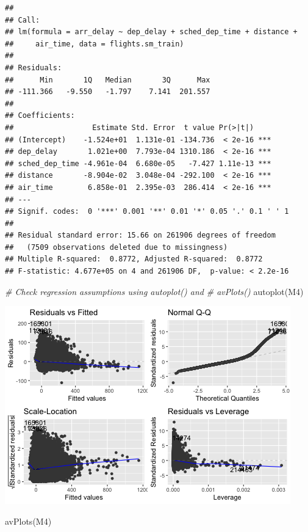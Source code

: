 \documentclass[
]{article}
\newenvironment{Shaded}{\begin{snugshade}}{\end{snugshade}}
\newcommand{\CommentTok}[1]{\textcolor[rgb]{0.56,0.35,0.01}{\textit{#1}}}
\newcommand{\FunctionTok}[1]{\textcolor[rgb]{0.00,0.00,0.00}{#1}}
\newcommand{\NormalTok}[1]{#1}
\begin{document}
\begin{verbatim}
## 
## Call:
## lm(formula = arr_delay ~ dep_delay + sched_dep_time + distance + 
##     air_time, data = flights.sm_train)
## 
## Residuals:
##      Min       1Q   Median       3Q      Max 
## -111.366   -9.550   -1.797    7.141  201.557 
## 
## Coefficients:
##                  Estimate Std. Error  t value Pr(>|t|)    
## (Intercept)    -1.524e+01  1.131e-01 -134.736  < 2e-16 ***
## dep_delay       1.021e+00  7.793e-04 1310.186  < 2e-16 ***
## sched_dep_time -4.961e-04  6.680e-05   -7.427 1.11e-13 ***
## distance       -8.904e-02  3.048e-04 -292.100  < 2e-16 ***
## air_time        6.858e-01  2.395e-03  286.414  < 2e-16 ***
## ---
## Signif. codes:  0 '***' 0.001 '**' 0.01 '*' 0.05 '.' 0.1 ' ' 1
## 
## Residual standard error: 15.66 on 261906 degrees of freedom
##   (7509 observations deleted due to missingness)
## Multiple R-squared:  0.8772, Adjusted R-squared:  0.8772 
## F-statistic: 4.677e+05 on 4 and 261906 DF,  p-value: < 2.2e-16
\end{verbatim}

\begin{Shaded}
\begin{Highlighting}[]
\CommentTok{\# Check regression assumptions using autoplot() and}
\CommentTok{\# avPlots()}
\FunctionTok{autoplot}\NormalTok{(M4)}
\end{Highlighting}
\end{Shaded}

\includegraphics{HW3-Trinath-Sai-Subhash-Reddy-Pittala_files/figure-latex/unnamed-chunk-9-1.png}

\begin{Shaded}
\begin{Highlighting}[]
\FunctionTok{avPlots}\NormalTok{(M4)}
\end{Highlighting}
\end{Shaded}
\end{document}

